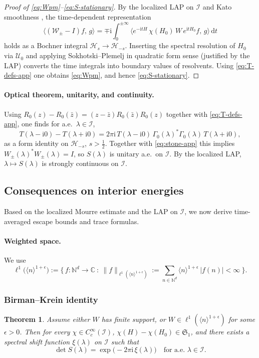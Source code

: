 \documentclass[10pt]{amsart}
\newcommand{\C}{{\mathbb{C}}}
\newcommand{\N}{{\mathbb{N}}}
\newcommand{\1}{{\mathbb{I}}}
\newcommand{\Hc}{\mathcal{H}}
\newcommand{\Ic}{\mathcal{I}}
\newcommand{\Wc}{\mathcal{W}}
\newcommand{\Uc}{\mathcal{U}}
\numberwithin{equation}{section}
\newtheorem{theorem}{Theorem}[section]%
\begin{document}
\begin{proof}[Proof of \eqref{eq:Wpm}--\eqref{eq:S-stationary}]
By the localized LAP on $\Ic$ and Kato smoothness \cite[Thms.~7.4.1--7.5.1]{ABG}, the time-dependent representation
\[
\big\langle (\Wc_{\pm}-I)f,\,g\big\rangle
=\mp \mathrm{i}\!\int_{0}^{\pm\infty}
\big\langle e^{-\mathrm{i} t H}\,\chi(H_{0})\,W\,e^{\mathrm{i} t H_{0}}f,\,g\big\rangle\,\mathrm{d} t
\]
holds as a Bochner integral $\Hc_s\to\Hc_{-s}$.
Inserting the spectral resolution of $H_0$ via $\Uc_0$ and applying Sokhotski--Plemelj in quadratic form sense (justified by the LAP) converts the time integrals into boundary values of resolvents. Using \eqref{eq:T-defs-app} one obtains \eqref{eq:Wpm}, and hence \eqref{eq:S-stationary}.
\end{proof}

\paragraph{Optical theorem, unitarity, and continuity.}
Using $R_{0}(z)-R_{0}(\bar z)=(z-\bar z)R_{0}(\bar z)R_{0}(z)$ together with \eqref{eq:T-defs-app}, one finds for a.e.\ $\lambda\in \Ic$,
\begin{equation}\label{eq:optical-app}
T(\lambda-\mathrm i0)-T(\lambda+\mathrm i0)
=2\pi\mathrm i\,T(\lambda-\mathrm i0)\,\Gamma_0(\lambda)^*\Gamma_0(\lambda)\,T(\lambda+\mathrm i0),
\end{equation}
as a form identity on $\Hc_{-s}$, $s>\tfrac{1}{2}$. Together with \eqref{eq:stone-app} this implies
$W_\pm(\lambda)^*W_\pm(\lambda)=I$, so $S(\lambda)$ is unitary a.e.\ on $\Ic$.
By the localized LAP, $\lambda\mapsto S(\lambda)$ is strongly continuous on $\Ic$.

\subsection{Consequences on interior energies}
Based on the localized Mourre estimate and the LAP on $\Ic$, we now derive time-averaged escape bounds and trace formulas.

\paragraph{Weighted space.}
We use
\[
\ell^{1}\!\big(\langle n\rangle^{1+\epsilon}\big)
:=\Big\{\,f:\N^d\to\C\ :\
\|f\|_{\ell^{1}(\langle n\rangle^{1+\epsilon})}
:=\sum_{n\in \N^d}\langle n\rangle^{1+\epsilon}\,|f(n)|<\infty\ \Big\}.
\]

\subsubsection{Birman--Krein identity}\label{subsubsec:BK}
\begin{theorem}\label{thm:BK}
Assume either $W$ has finite support, or $W\in \ell^1(\langle n\rangle^{1+\epsilon})$ for some $\epsilon>0$.
Then for every $\chi\in C_c^\infty(\Ic)$, $\chi(H)-\chi(H_{0})\in\mathfrak S_1$, and there exists a spectral shift
function $\xi(\lambda)$ on $\Ic$ such that
\[
\det S(\lambda)=\exp\!\bigl(-2\pi \mathrm i\,\xi(\lambda)\bigr)\quad\text{for a.e. }\lambda\in \Ic.
\]
\end{theorem}
\end{document}
